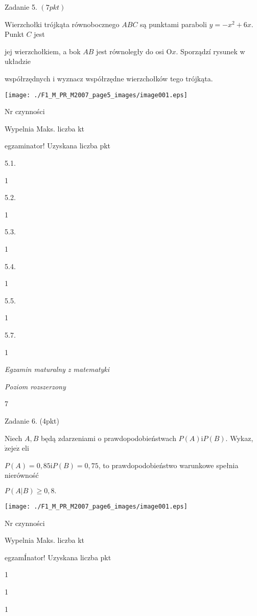 \documentclass[a4paper,12pt]{article}
\begin{document}
Zadanie 5. $(7pkt)$

Wierzchołki trójkąta równobocznego $ABC$ są punktami paraboli $y=-x^{2}+6x$. Punkt $C$ jest

jej wierzchołkiem, a bok $AB$ jest równoległy do osi $\mathrm{O}x$. Sporządzí rysunek w układzie

współrzędnych i wyznacz współrzędne wierzchołków tego trójkąta.
\begin{center}
\texttt{[image: ./F1\_M\_PR\_M2007\_page5\_images/image001.eps]}
\end{center}
Nr czynności

Wypelnia Maks. liczba kt

egzaminator! Uzyskana liczba pkt

5.1.

1

5.2.

1

5.3.

1

5.4.

1

5.5.

1

5.7.

1





{\it Egzamin maturalny z matematyki}

{\it Poziom rozszerzony}

7

Zadanie 6. (4pkt)

Niech $A, B$ będą zdarzeniami o prawdopodobieństwach $P(A) \mathrm{i} P(B)$. Wykaz, $\dot{\mathrm{z}}\mathrm{e}\mathrm{j}\mathrm{e}\dot{\mathrm{z}}$ eli

$P(A)=0,85 \mathrm{i} P(B)=0,75$, to prawdopodobieństwo warunkowe spełnia nierówność

$P(A|B)\geq 0,8.$
\begin{center}
\texttt{[image: ./F1\_M\_PR\_M2007\_page6\_images/image001.eps]}
\end{center}
Nr czynności

Wypelnia Maks. liczba kt

egzamÍnator! Uzyskana liczba pkt

1

1

1
\end{document}
